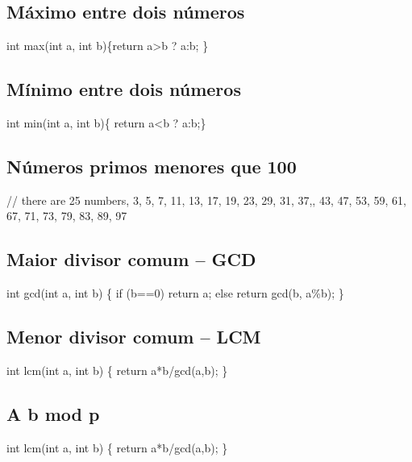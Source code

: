 \documentclass[a4paper,12pt]{article}
\begin{document}
\subsection{Máximo entre dois números}

int max(int a, int b)\newline\{return a>b ? a:b; \}

\subsection{Mínimo entre dois números}

int min(int a, int b)\newline \{ return a<b ? a:b;\}

\subsection{Números primos menores que 100}

// there are 25 numbers, 3, 5, 7, 11, 13, 17, 19, 23, 29, 31, 37,, 43, 47, 53, 59, 61, 67, 71, 73, 79, 83, 89, 97

\subsection{Maior divisor comum – GCD}

int gcd(int a, int b)\newline
\{\newline
    if (b==0) return a;\newline
    else return gcd(b, a\%b);\newline
\}\newline

\subsection{Menor divisor comum – LCM}

int lcm(int a, int b)\newline
\{\newline
return a*b/gcd(a,b);\newline
\}

\subsection{A b mod p}

int lcm(int a, int b)\newline
\{\newline
return a*b/gcd(a,b);\newline
\}
\end{document}
